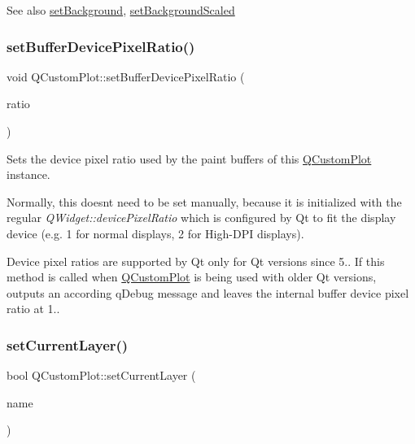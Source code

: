 \begin{DoxySeeAlso}{See also}
\mbox{\hyperlink{class_q_custom_plot_a130358592cfca353ff3cf5571b49fb00}{set\+Background}}, \mbox{\hyperlink{class_q_custom_plot_a36f0fa1317325dc7b7efea615ee2de1f}{set\+Background\+Scaled}} 
\end{DoxySeeAlso}
\mbox{\label{class_q_custom_plot_a159162653ad6f8b8bf21263ba5787215}} 
\subsubsection{\texorpdfstring{setBufferDevicePixelRatio()}{setBufferDevicePixelRatio()}}
{\footnotesize\ttfamily void Q\+Custom\+Plot\+::set\+Buffer\+Device\+Pixel\+Ratio (\begin{DoxyParamCaption}\item[{double}]{ratio }\end{DoxyParamCaption})}

Sets the device pixel ratio used by the paint buffers of this \mbox{\hyperlink{class_q_custom_plot}{Q\+Custom\+Plot}} instance.

Normally, this doesn\textquotesingle{}t need to be set manually, because it is initialized with the regular {\itshape Q\+Widget\+::device\+Pixel\+Ratio} which is configured by Qt to fit the display device (e.\+g. 1 for normal displays, 2 for High-\/\+D\+PI displays).

Device pixel ratios are supported by Qt only for Qt versions since 5.. If this method is called when \mbox{\hyperlink{class_q_custom_plot}{Q\+Custom\+Plot}} is being used with older Qt versions, outputs an according q\+Debug message and leaves the internal buffer device pixel ratio at 1.. \mbox{\label{class_q_custom_plot_a73a6dc47c653bb6f8f030abca5a11852}} 
\subsubsection{\texorpdfstring{setCurrentLayer()}{setCurrentLayer()}\hspace{0.1cm}{\footnotesize\ttfamily [1/2]}}
{\footnotesize\ttfamily bool Q\+Custom\+Plot\+::set\+Current\+Layer (\begin{DoxyParamCaption}\item[{const Q\+String \&}]{name }\end{DoxyParamCaption})}

